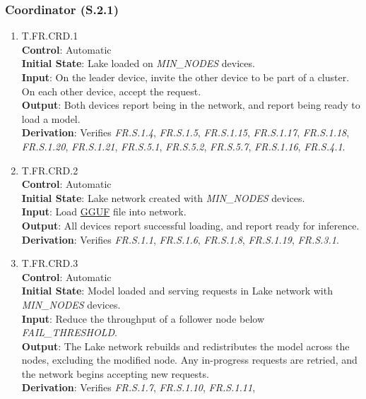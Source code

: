 \documentclass[12pt, titlepage]{article}
\providecommand{\glink}[2]{\hyperlink{gls:#1}{#2}}
\begin{document}
\subsubsection{Coordinator (S.2.1)}
\begin{enumerate}
	\item{T.FR.CRD.1}\label{T.FR.CRD.1} \\
		\textbf{Control}: Automatic \\
		\textbf{Initial State}: Lake loaded on \textit{MIN\_NODES} devices. \\
		\textbf{Input}: On the leader device, invite the other device to be part
		of a cluster. On each other device, accept the request. \\
		\textbf{Output}: Both devices report being in the network, and report being
		ready to load a model. \\
		\textbf{Derivation}: Verifies \textit{FR.S.1.4}, \textit{FR.S.1.5}, \textit{FR.S.1.15},
		\textit{FR.S.1.17}, \textit{FR.S.1.18}, \textit{FR.S.1.20}, \textit{FR.S.1.21},
		\textit{FR.S.5.1}, \textit{FR.S.5.2}, \textit{FR.S.5.7}, \textit{FR.S.1.16}, \textit{FR.S.4.1}.
	\item{T.FR.CRD.2}\label{T.FR.CRD.2} \\
		\textbf{Control}: Automatic \\
		\textbf{Initial State}: Lake network created with \textit{MIN\_NODES} devices. \\
		\textbf{Input}: Load \glink{gguf}{GGUF} file into network. \\
		\textbf{Output}: All devices report successful loading, and report ready for inference. \\
		\textbf{Derivation}: Verifies \textit{FR.S.1.1}, \textit{FR.S.1.6}, \textit{FR.S.1.8},
		\textit{FR.S.1.19}, \textit{FR.S.3.1}.
	\item{T.FR.CRD.3}\label{T.FR.CRD.3} \\
		\textbf{Control}: Automatic \\
		\textbf{Initial State}: Model loaded and serving requests in Lake network with \textit{MIN\_NODES}
		devices. \\
		\textbf{Input}: Reduce the throughput of a follower node below \textit{FAIL\_THRESHOLD}. \\
		\textbf{Output}: The Lake network rebuilds and redistributes the model across the nodes,
		excluding the modified node.
		Any in-progress requests are retried, and the network begins accepting new requests. \\
		\textbf{Derivation}: Verifies \textit{FR.S.1.7}, \textit{FR.S.1.10}, \textit{FR.S.1.11},

\end{enumerate}
\end{document}
